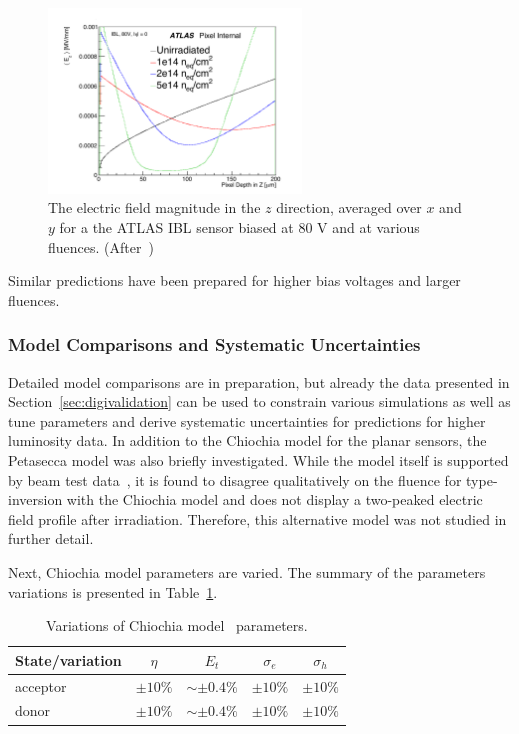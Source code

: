 \begin{figure}[!htpb]
\centering
\includegraphics[width=0.6\textwidth]{newEz_0fluence80V.pdf}
\caption{The electric field magnitude in the $z$ direction, averaged over $x$ and $y$ for a the ATLAS IBL sensor biased at 80 V and at various fluences. (After~\cite{Benoit:2255825})}
\label{fig:electricfield:profilesRun23}
\end{figure}

Similar predictions have been prepared for higher bias voltages and larger fluences.

\subsubsection{Model Comparisons and Systematic Uncertainties}
\label{sec:Efieldmodelcomparisons}

Detailed model comparisons are in preparation, but already the data presented in Section~\ref{sec:digivalidation} can be used to constrain various simulations as well as tune parameters and derive systematic uncertainties for predictions for higher luminosity data.  In addition to the Chiochia model for the planar sensors, the Petasecca model was also briefly investigated.  While the model itself is supported by beam test data~\cite{1710302}, it is found to disagree qualitatively on the fluence for type-inversion with the Chiochia model and does not display a two-peaked electric field profile after irradiation.  Therefore, this alternative model was not studied in further detail.

Next, Chiochia model parameters are varied.
The summary of the parameters variations is presented in Table~\ref{tab:parVars}.

\begin{table}[!htpb]
\caption{Variations of Chiochia model~\cite{Chiochia:2004qh} parameters.}
\label{tab:parVars}
\centering
\begin{tabular}{lcccc}
  \hline
  State/variation & $\eta$ & $E_t$ & $\sigma_e$ & $\sigma_h$		\\
   \hline
   \hline	
   acceptor & $\pm 10\%$ & $\sim\pm0.4\%$ & $\pm10\%$ & $\pm10\%$ \\
   donor & $\pm 10\%$ & $\sim\pm0.4\%$ & $\pm10\%$ & $\pm10\%$ \\
  \hline  
\end{tabular}
\end{table}

